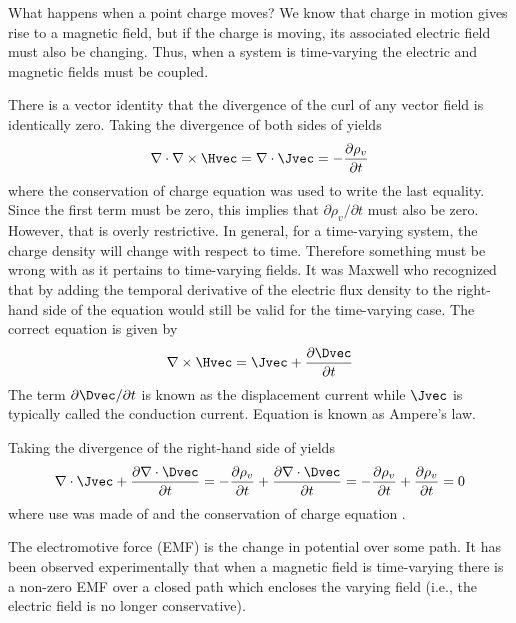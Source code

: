 What happens when a point charge moves?  We know that charge in motion
gives rise to a magnetic field, but if the charge is moving, its
associated electric field must also be changing.  Thus, when a system
is time-varying the electric and magnetic fields must be coupled.

There is a vector identity that the divergence of the curl of any
vector field is identically zero.  Taking the divergence of both sides
of  yields
\begin{equation}
  \nabla\cdot \nabla \times \Hvec = 
  \nabla\cdot \Jvec =
  -\frac{\partial\rho_v}{\partial t}
\end{equation}
where the conservation of charge equation was used to write the last
equality.  Since the first term must be zero, this implies that 
$\partial\rho_v/\partial t$ must also be zero.  However, that
is overly restrictive.  In general, for a time-varying system, the
charge density will change with respect to time.  Therefore something
must be wrong with  as it pertains to time-varying
fields.  It was Maxwell who recognized that by adding the temporal
derivative of the electric flux density to the right-hand side of
 the equation would still be valid for the
time-varying case.  The correct equation is given by
\begin{equation}
  \nabla \times \Hvec = \Jvec + \frac{\partial \Dvec}{\partial t}
  \label{eq:curlHac}
\end{equation}
The term $\partial \Dvec/\partial t$ is known as the displacement
current while $\Jvec$ is typically called the conduction current.
Equation  is known as Ampere's law.

Taking the divergence of the right-hand side of 
yields
\begin{equation}
  \nabla\cdot\Jvec + \frac{\partial \nabla\cdot\Dvec}{\partial t} = 
  -\frac{\partial \rho_v}{\partial t} + 
    \frac{\partial \nabla\cdot\Dvec}{\partial t} = 
  -\frac{\partial \rho_v}{\partial t} + 
    \frac{\partial \rho_v}{\partial t}
  =  0
\end{equation}
where use was made of  and the conservation of charge
equation .

The electromotive force (EMF) is the change in potential over some
path.  It has been observed experimentally that when a magnetic field
is time-varying there is a non-zero EMF over a closed path which
encloses the varying field (i.e., the electric field is no longer
conservative).  

